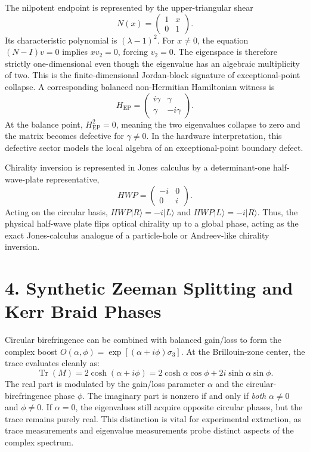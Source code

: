 \documentclass[aps,prl,twocolumn,superscriptaddress,amsmath,amssymb]{revtex4-2}
\begin{document}
The nilpotent endpoint is represented by the upper-triangular shear
\begin{equation}
N(x)=
\begin{pmatrix}
1 & x\\
0 & 1
\end{pmatrix}.
\end{equation}
Its characteristic polynomial is $(\lambda-1)^2$. For $x\neq0$, the equation $(N-I)v=0$ implies $xv_2=0$, forcing $v_2=0$. The eigenspace is therefore strictly one-dimensional even though the eigenvalue has an algebraic multiplicity of two. This is the finite-dimensional Jordan-block signature of exceptional-point collapse. A corresponding balanced non-Hermitian Hamiltonian witness is
\begin{equation}
H_{\mathrm{EP}}=
\begin{pmatrix}
i\gamma & \gamma\\
\gamma & -i\gamma
\end{pmatrix}.
\end{equation}
At the balance point, $H_{\mathrm{EP}}^2=0$, meaning the two eigenvalues collapse to zero and the matrix becomes defective for $\gamma\neq0$. In the hardware interpretation, this defective sector models the local algebra of an exceptional-point boundary defect.

Chirality inversion is represented in Jones calculus by a determinant-one half-wave-plate representative,
\begin{equation}
HWP=
\begin{pmatrix}
-i & 0\\
0 & i
\end{pmatrix}.
\end{equation}
Acting on the circular basis, $HWP|R\rangle=-i|L\rangle$ and $HWP|L\rangle=-i|R\rangle$. Thus, the physical half-wave plate flips optical chirality up to a global phase, acting as the exact Jones-calculus analogue of a particle-hole or Andreev-like chirality inversion.

\section{4. Synthetic Zeeman Splitting and Kerr Braid Phases}

Circular birefringence can be combined with balanced gain/loss to form the complex boost $O(\alpha,\phi)=\exp[(\alpha+i\phi)\sigma_3]$. At the Brillouin-zone center, the trace evaluates cleanly as:
\begin{equation}
\operatorname{Tr}(M) = 2\cosh(\alpha + i\phi) = 2\cosh\alpha\cos\phi + 2i\sinh\alpha\sin\phi.
\end{equation}
The real part is modulated by the gain/loss parameter $\alpha$ and the circular-birefringence phase $\phi$. The imaginary part is nonzero if and only if \textit{both} $\alpha\neq0$ and $\phi\neq0$. If $\alpha=0$, the eigenvalues still acquire opposite circular phases, but the trace remains purely real. This distinction is vital for experimental extraction, as trace measurements and eigenvalue measurements probe distinct aspects of the complex spectrum.
\end{document}
